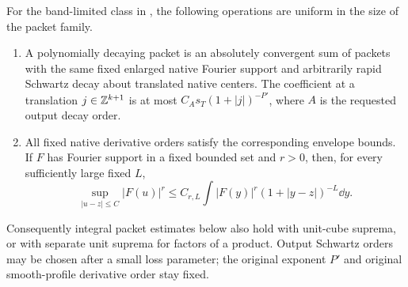 \begin{lemma}\label{p:reproduction}
For the band-limited class in , the following operations
are uniform in the size of the packet family.

\begin{enumerate}
\item A polynomially decaying packet is an absolutely convergent sum of packets
with the same fixed enlarged native Fourier support and arbitrarily rapid
Schwartz decay about translated native centers.  The coefficient at a
translation $j\in\mathbb Z^{k+1}$ is at most
$C_A s_T(1+|j|)^{-P'}$, where $A$ is the requested output decay order.
\item All fixed native derivative orders satisfy the corresponding envelope
bounds.  If $F$ has Fourier support in a fixed bounded set and $r>0$, then,
for every sufficiently large fixed $L$,
\begin{equation}\label{p:sup-convolution}
 \sup_{|u-z|\leq C}|F(u)|^r
 \leq C_{r,L}\int |F(y)|^r(1+|y-z|)^{-L}\dd y.
\end{equation}
\end{enumerate}
Consequently integral packet estimates below also hold with unit-cube
suprema, or with separate unit suprema for factors of a product.  Output
Schwartz orders may be chosen after a small loss parameter; the original
exponent $P'$ and original smooth-profile derivative order stay fixed.
\end{lemma}

